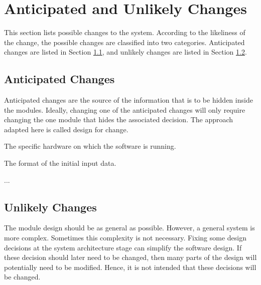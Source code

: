 \documentclass[12pt, titlepage]{article}
\newcounter{acnum}
\newcommand{\actheacnum}{AC\theacnum}
\begin{document}
\section{Anticipated and Unlikely Changes} \label{SecChange}

This section lists possible changes to the system. According to the likeliness
of the change, the possible changes are classified into two
categories. Anticipated changes are listed in Section \ref{SecAchange}, and
unlikely changes are listed in Section \ref{SecUchange}.

\subsection{Anticipated Changes} \label{SecAchange}

Anticipated changes are the source of the information that is to be hidden
inside the modules. Ideally, changing one of the anticipated changes will only
require changing the one module that hides the associated decision. The approach
adapted here is called design for
change.

\begin{description}
\item[ \actheacnum \label{acHardware}:] The specific
  hardware on which the software is running.
\item[ \actheacnum \label{acInput}:] The format of the
  initial input data.
\item ...
\end{description}


\subsection{Unlikely Changes} \label{SecUchange}

The module design should be as general as possible. However, a general system is
more complex. Sometimes this complexity is not necessary. Fixing some design
decisions at the system architecture stage can simplify the software design. If
these decision should later need to be changed, then many parts of the design
will potentially need to be modified. Hence, it is not intended that these
decisions will be changed.
\end{document}
